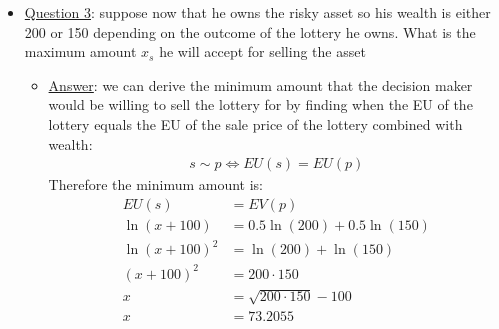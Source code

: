 \documentclass{article}
\begin{document}
  \begin{itemize}
    \item  \underline{Question 3}: suppose now that he owns the risky asset so his wealth is either 200 or 150 depending on the outcome of the lottery he owns. What is the maximum amount $x_{s}$ he will accept for selling the asset
    \begin{itemize}
      \item  \underline{Answer}: we can derive the minimum amount that the decision maker would be willing to sell the lottery for by finding when the EU of the lottery equals the EU of the sale price of the lottery combined with wealth:
      \begin{gather*}
          s \sim p \Leftrightarrow EU(s) = EU(p)
      \end{gather*}
      Therefore the minimum amount is:
      \begin{align*}
        EU(s) &= EV(p) \\
        \ln (x + 100) &= 0.5 \ln (200) + 0.5 \ln (150) \\
        \ln (x + 100)^{2} &= \ln (200) + \ln (150) \\
        (x + 100)^{2} &= 200 \cdot 150 \\
        x &= \sqrt{200 \cdot 150} - 100 \\
        x &= 73.2055
      \end{align*}
    \end{itemize}
  \end{itemize}
\end{document}
